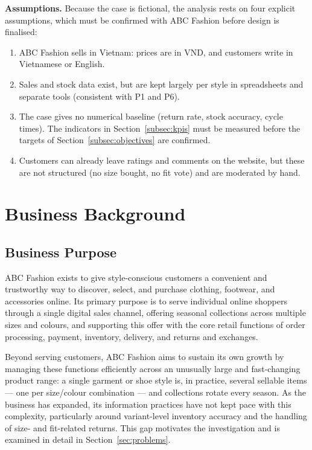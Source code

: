 \documentclass[11pt,a4paper,oneside]{extreport}
\newif\ifshowvtwo
\newcommand{\vtwocolor}{\ifshowvtwo\color{red}\fi}
\newenvironment{updated}{\par\vtwocolor}{\par}
\begin{document}
\begin{updated}
\textbf{Assumptions.} Because the case is fictional, the analysis rests on four explicit assumptions, which must be confirmed with ABC Fashion before design is finalised:
\begin{enumerate}[label=\textbf{A\arabic*.},leftmargin=1cm]
  \item ABC Fashion sells in Vietnam: prices are in VND, and customers write in Vietnamese or English.
  \item Sales and stock data exist, but are kept largely per style in spreadsheets and separate tools (consistent with P1 and P6).
  \item The case gives no numerical baseline (return rate, stock accuracy, cycle times). The indicators in Section~\ref{subsec:kpis} must be measured before the targets of Section~\ref{subsec:objectives} are confirmed.
  \item Customers can already leave ratings and comments on the website, but these are not structured (no size bought, no fit vote) and are moderated by hand.
\end{enumerate}
\end{updated}

\section{Business Background}
\label{sec:background}

\subsection{Business Purpose}
ABC Fashion exists to give style-conscious customers a convenient and trustworthy way to discover, select, and purchase clothing, footwear, and accessories online. Its primary purpose is to serve individual online shoppers through a single digital sales channel, offering seasonal collections across multiple sizes and colours, and supporting this offer with the core retail functions of order processing, payment, inventory, delivery, and returns and exchanges.

Beyond serving customers, ABC Fashion aims to sustain its own growth by managing these functions efficiently across an unusually large and fast-changing product range: a single garment or shoe style is, in practice, several sellable items --- one per size/colour combination --- and collections rotate every season. As the business has expanded, its information practices have not kept pace with this complexity, particularly around variant-level inventory accuracy and the handling of size- and fit-related returns. This gap motivates the investigation and is examined in detail in Section~\ref{sec:problems}.
\end{document}
